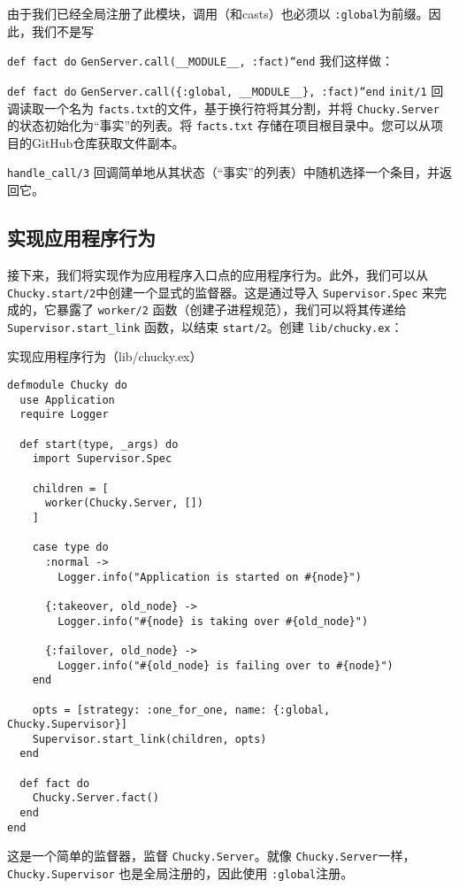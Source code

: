 由于我们已经全局注册了此模块，调用（和casts）也必须以
\texttt{:global}为前缀。因此，我们不是写

\texttt{def fact do}
\texttt{GenServer.call(\_\_MODULE\_\_, :fact)``end}
我们这样做：

\texttt{def fact do}
\texttt{GenServer.call(\{:global, \_\_MODULE\_\_\}, :fact)``end}
\texttt{init/1} 回调读取一个名为
\texttt{facts.txt}的文件，基于换行符将其分割，并将
\texttt{Chucky.Server} 的状态初始化为``事实''的列表。将
\texttt{facts.txt}
存储在项目根目录中。您可以从项目的GitHub仓库获取文件副本。

\texttt{handle\_call/3}
回调简单地从其状态（``事实''的列表）中随机选择一个条目，并返回它。

\subsection{实现应用程序行为}

接下来，我们将实现作为应用程序入口点的应用程序行为。此外，我们可以从
\texttt{Chucky.start/2}中创建一个显式的监督器。这是通过导入
\texttt{Supervisor.Spec} 来完成的，它暴露了
\texttt{worker/2}
函数（创建子进程规范），我们可以将其传递给
\texttt{Supervisor.start\_link} 函数，以结束
\texttt{start/2}。创建
\texttt{lib/chucky.ex}：

\begin{code}{实现应用程序行为（lib/chucky.ex）}
\begin{verbatim}
defmodule Chucky do
  use Application
  require Logger

  def start(type, _args) do
    import Supervisor.Spec

    children = [
      worker(Chucky.Server, [])
    ]

    case type do
      :normal ->
        Logger.info("Application is started on #{node}")

      {:takeover, old_node} ->
        Logger.info("#{node} is taking over #{old_node}")

      {:failover, old_node} ->
        Logger.info("#{old_node} is failing over to #{node}")
    end

    opts = [strategy: :one_for_one, name: {:global, Chucky.Supervisor}]
    Supervisor.start_link(children, opts)
  end

  def fact do
    Chucky.Server.fact()
  end
end
\end{verbatim}
\end{code}

这是一个简单的监督器，监督 \texttt{Chucky.Server}。就像
\texttt{Chucky.Server}一样，
\texttt{Chucky.Supervisor} 也是全局注册的，因此使用
\texttt{:global}注册。

